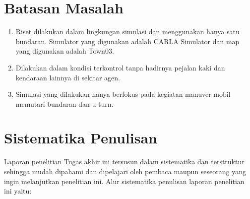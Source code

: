 \section{Batasan Masalah}
\label{sec:batasanmasalah}

\begin{enumerate}[nolistsep]
	
	\item Riset dilakukan dalam lingkungan simulasi dan menggunakan hanya satu bundaran. Simulator yang digunakan adalah CARLA Simulator dan map yang digunakan adalah Town03.
	
	\item Dilakukan dalam kondisi terkontrol tanpa hadirnya pejalan kaki dan kendaraan lainnya di sekitar agen.
	
	\item Simulasi yang dilakukan hanya berfokus pada kegiatan manuver mobil memutari bundaran dan u-turn.
	
\end{enumerate}


\section{Sistematika Penulisan}
\label{sec:sistematikapenulisan}

Laporan penelitian Tugas akhir ini tersusun dalam sistematika dan terstruktur sehingga mudah dipahami dan dipelajari oleh pembaca maupun seseorang yang ingin melanjutkan penelitian ini. Alur sistematika penulisan laporan penelitian ini yaitu:


